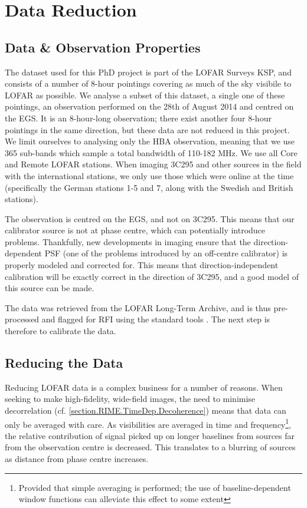 \section{Data Reduction}


\subsection{Data \& Observation Properties}
\pg
The dataset used for this PhD project is part of the LOFAR Surveys KSP, and consists of a number of 8-hour pointings covering as much of the sky visibile to LOFAR as possible. We analyse a subset of this dataset, a single one of these pointings, an observation performed on the 28th of August 2014 and centred on the EGS. It is an 8-hour-long observation; there exist another four 8-hour pointings in the same direction, but these data are not reduced in this project. We limit ourselves to analysing only the HBA observation, meaning that we use 365 sub-bands which sample a total bandwidth of 110-182 MHz. We use all Core and Remote LOFAR stations. When imaging 3C295 and other sources in the field with the international stations, we only use those which were online at the time (specifically the German stations 1-5 and 7, along with the Swedish and British stations).

\pg
The observation is centred on the EGS, and not on 3C295. This means that our calibrator source is not at phase centre, which can potentially introduce problems. Thankfully, new developments in imaging  ensure that the direction-dependent PSF (one of the problems introduced by an off-centre calibrator) is properly modeled and corrected for. This means that direction-independent calibration will be exactly correct in the direction of 3C295, and a good model of this source can be made.

\pg
The data was retrieved from the LOFAR Long-Term Archive, and is thus pre-processed and flagged for RFI using the standard tools . The next step is therefore to calibrate the data.

\subsection{Reducing the Data}

\pg
Reducing LOFAR data is a complex business for a number of reasons. When seeking to make high-fidelity, wide-field images, the need to minimise decorrelation (cf. \cref{section.RIME.TimeDep.Decoherence}) means that data can only be averaged with care. As visibilities are averaged in time and frequency\footnote{Provided that simple averaging is performed; the use of baseline-dependent window functions can alleviate this effect to some extent}, the relative contribution of signal picked up on longer baselines from sources far from the observation centre is decreased. This translates to a blurring of sources as distance from phase centre increases.

